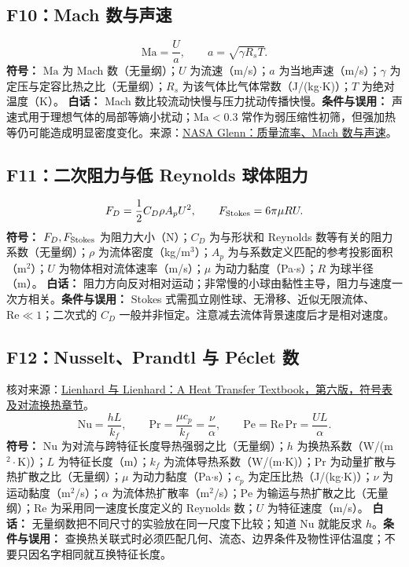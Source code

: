 \subsection{F10：Mach 数与声速}
\begin{equation}
\mathrm{Ma}=\frac Ua,\qquad a=\sqrt{\gamma R_sT}.
\end{equation}
\textbf{符号：} $\mathrm{Ma}$ 为 Mach 数（无量纲）；$U$ 为流速（m/s）；$a$ 为当地声速（m/s）；$\gamma$ 为定压与定容比热之比（无量纲）；$R_s$ 为该气体比气体常数（J/(kg$\cdot$K)）；$T$ 为绝对温度（K）。
\textbf{白话：} Mach 数比较流动快慢与压力扰动传播快慢。\textbf{条件与误用：} 声速式用于理想气体的局部等熵小扰动；$\mathrm{Ma}<0.3$ 常作为弱压缩性初筛，但强加热等仍可能造成明显密度变化。来源：\href{https://www1.grc.nasa.gov/beginners-guide-to-aeronautics/mass-flow-rate-equations/}{NASA Glenn：质量流率、Mach 数与声速}。

\subsection{F11：二次阻力与低 Reynolds 球体阻力}
\begin{equation}
F_D=\frac12C_D\rho A_pU^2,\qquad F_{\rm Stokes}=6\pi\mu RU.
\end{equation}
\textbf{符号：} $F_D,F_{\rm Stokes}$ 为阻力大小（N）；$C_D$ 为与形状和 Reynolds 数等有关的阻力系数（无量纲）；$\rho$ 为流体密度（kg/m$^3$）；$A_p$ 为与系数定义匹配的参考投影面积（m$^2$）；$U$ 为物体相对流体速率（m/s）；$\mu$ 为动力黏度（Pa$\cdot$s）；$R$ 为球半径（m）。
\textbf{白话：} 阻力方向反对相对运动；非常慢的小球由黏性主导，阻力与速度一次方相关。\textbf{条件与误用：} Stokes 式需孤立刚性球、无滑移、近似无限流体、$\mathrm{Re}\ll1$；二次式的 $C_D$ 一般并非恒定。注意减去流体背景速度后才是相对速度。

\subsection{F12：Nusselt、Prandtl 与 P\'eclet 数}
核对来源：\href{https://bpb-us-e1.wpmucdn.com/sites.mit.edu/dist/6/1810/files/2024/04/AHTTv600.pdf}{Lienhard 与 Lienhard：A Heat Transfer Textbook，第六版，符号表及对流换热章节}。
\begin{equation}
\mathrm{Nu}=\frac{hL}{k_f},\qquad \mathrm{Pr}=\frac{\mu c_p}{k_f}=\frac\nu\alpha,\qquad \mathrm{Pe}=\mathrm{Re}\,\mathrm{Pr}=\frac{UL}{\alpha}.
\end{equation}
\textbf{符号：} $\mathrm{Nu}$ 为对流与跨特征长度导热强弱之比（无量纲）；$h$ 为换热系数（W/(m$^2\cdot$K)）；$L$ 为特征长度（m）；$k_f$ 为流体导热系数（W/(m$\cdot$K)）；$\mathrm{Pr}$ 为动量扩散与热扩散之比（无量纲）；$\mu$ 为动力黏度（Pa$\cdot$s）；$c_p$ 为定压比热（J/(kg$\cdot$K)）；$\nu$ 为运动黏度（m$^2$/s）；$\alpha$ 为流体热扩散率（m$^2$/s）；$\mathrm{Pe}$ 为输运与热扩散之比（无量纲）；$\mathrm{Re}$ 为采用同一速度长度定义的 Reynolds 数；$U$ 为特征速度（m/s）。
\textbf{白话：} 无量纲数把不同尺寸的实验放在同一尺度下比较；知道 Nu 就能反求 $h$。\textbf{条件与误用：} 查换热关联式时必须匹配几何、流态、边界条件及物性评估温度；不要只因名字相同就互换特征长度。

